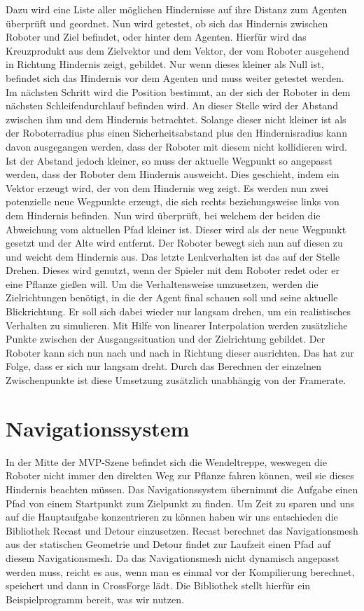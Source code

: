 Dazu wird eine Liste aller möglichen Hindernisse auf ihre Distanz zum Agenten überprüft und geordnet. Nun wird getestet, ob sich das Hindernis zwischen Roboter und Ziel befindet, oder hinter dem Agenten. Hierfür wird das Kreuzprodukt aus dem Zielvektor und dem Vektor, der vom Roboter ausgehend in Richtung Hindernis zeigt, gebildet. Nur wenn dieses kleiner als Null ist, befindet sich das Hindernis vor dem Agenten und muss weiter getestet werden. Im nächsten Schritt wird die Position bestimmt, an der sich der Roboter in dem nächsten Schleifendurchlauf befinden wird. An dieser Stelle wird der Abstand zwischen ihm und dem Hindernis betrachtet. Solange dieser nicht kleiner ist als der Roboterradius plus einen Sicherheitsabstand plus den Hindernisradius kann davon ausgegangen werden, dass der Roboter mit diesem nicht kollidieren wird. Ist der Abstand jedoch kleiner, so muss der aktuelle Wegpunkt so angepasst werden, dass der Roboter dem Hindernis ausweicht. Dies geschieht, indem ein Vektor erzeugt wird, der von dem Hindernis weg zeigt. Es werden nun zwei potenzielle neue Wegpunkte erzeugt, die sich rechts beziehungsweise links von dem Hindernis befinden. Nun wird überprüft, bei welchem der beiden die Abweichung vom aktuellen Pfad kleiner ist. Dieser wird als der neue Wegpunkt gesetzt und der Alte wird entfernt. Der Roboter bewegt sich nun auf diesen zu und weicht dem Hindernis aus.
Das letzte Lenkverhalten ist das auf der Stelle Drehen. Dieses wird genutzt, wenn der Spieler mit dem Roboter redet oder er eine Pflanze gießen will. Um die Verhaltensweise umzusetzen, werden die Zielrichtungen benötigt, in die der Agent final schauen soll und seine aktuelle Blickrichtung. Er soll sich dabei wieder nur langsam drehen, um ein realistisches Verhalten zu simulieren. Mit Hilfe von linearer Interpolation werden zusätzliche Punkte zwischen der Ausgangssituation und der Zielrichtung gebildet. Der Roboter kann sich nun nach und nach in Richtung dieser ausrichten. Das hat zur Folge, dass er sich nur langsam dreht. Durch das Berechnen der einzelnen Zwischenpunkte ist diese Umsetzung zusätzlich unabhängig von der Framerate.

\section{Navigationssystem}

In der Mitte der MVP-Szene befindet sich die Wendeltreppe, weswegen die Roboter nicht immer den direkten Weg zur Pflanze fahren können, weil sie dieses Hindernis beachten müssen. Das Navigationssystem übernimmt die Aufgabe einen Pfad von einem Startpunkt zum Zielpunkt zu finden. Um Zeit zu sparen und uns auf die Hauptaufgabe konzentrieren zu können haben wir uns entschieden die Bibliothek Recast und Detour einzusetzen. Recast berechnet das Navigationsmesh aus der statischen Geometrie und Detour findet zur Laufzeit einen Pfad auf diesem Navigationsmesh. Da das Navigationsmesh nicht dynamisch angepasst werden muss, reicht es aus, wenn man es einmal vor der Kompilierung berechnet, speichert und dann in CrossForge lädt. Die Bibliothek stellt hierfür ein Beispielprogramm bereit, was wir nutzen.

